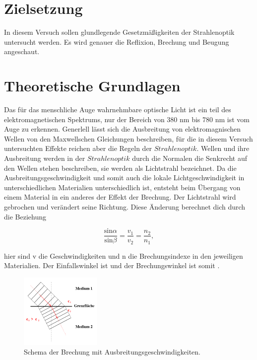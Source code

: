 \section{Zielsetzung}

    \noindent In diesem Versuch sollen glundlegende Gesetzmäßigkeiten der Strahlenoptik untersucht werden.
    Es wird genauer die Reflixion, Brechung und Beugung angeschaut.

\section{Theoretische Grundlagen}

    Das für das menschliche Auge wahrnehmbare optische Licht ist ein teil des elektromagnetischen Spektrums, nur der Bereich von 380 nm bis 780 
    nm ist vom Auge zu erkennen. Generlell lässt sich die Ausbreitung von elektromagnischen Wellen von den Maxwellschen Gleichungen beschreiben, 
    für die in diesem Versuch untersuchten Effekte reichen aber die Regeln der $Strahlenoptik$. Wellen und ihre Ausbreitung werden in der 
    $Strahlenoptik$ durch die Normalen die Senkrecht auf den Wellen stehen beschreiben, sie werden als Lichtstrahl bezeichnet. Da die 
    Ausbreitungsgeschwindigkeit und somit auch die lokale Lichtgeschwindigkeit in unterschiedlichen Materialien unterschiedlich ist, entsteht beim 
    Übergang von einem Material in ein anderes der Effekt der Brechung. Der Lichtstrahl wird gebrochen und verändert seine Richtung. 
    Diese Änderung berechnet dich durch die Beziehung

    \begin{equation}
        \frac{\text{sin}\alpha}{\text{sin} \beta} = \frac{v_1}{v_2} = \frac{n_2}{n_1},
    \end{equation}

    \noindent   hier sind v die Geschwindigkeiten und n die Brechungsindexe in den jeweiligen Materialien. Der Einfallswinkel ist \alpha und der 
    Brechungswinkel ist somit \beta.

    \begin{figure}[H]
        \centering
        \includegraphics[width=0.35\textwidth]{latex/images/T1.PNG}
        \caption{Schema der Brechung mit Ausbreitungsgeschwindigkeiten\protect \cite{400}.}
    \end{figure}

